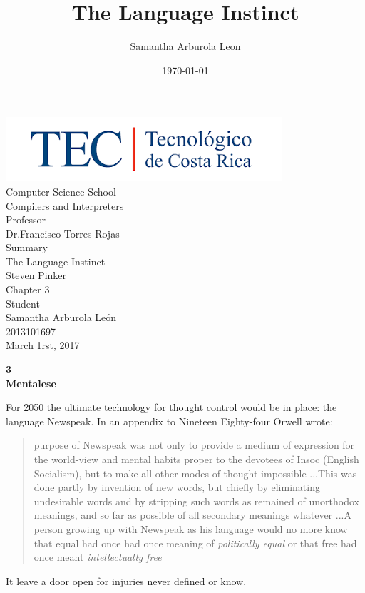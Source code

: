 \documentclass[13pt,letterpaper,onecolumn]{report}
\author{Samantha Arburola Leon}
\title{The Language Instinct}
\date{\today}
\begin{document}
\vspace{10em}
\begin{center}
\includegraphics{tec} \\
\vspace{2em}
Computer Science School\\Compilers and Interpreters\\
\vspace{1em}
Professor\\Dr.Francisco Torres Rojas \\
\vspace{7em}
Summary \\ The Language Instinct\\Steven Pinker\\Chapter 3\\
\vspace{5em}
Student\\ Samantha Arburola Le\'on \\ 2013101697\\
\vspace{10em}
March 1rst, 2017
\end{center}
\pagebreak[4]

\begin{center}
{\huge\bfseries 3\\Mentalese\par} \vspace{2em}
\end{center}
\hspace{1em}For 2050 the ultimate technology for thought control would be in place: the language Newspeak. In an appendix to Nineteen Eighty-four Orwell wrote:\\
\begin{quote}
purpose of Newspeak was not only to provide a medium of expression for the world-view and mental habits proper to the devotees of Insoc (English Socialism), but to make all other modes of thought impossible ...This was done partly by invention of new words, but chiefly by eliminating undesirable words and by stripping such words as remained of unorthodox meanings, and so far as possible of all secondary meanings whatever ...A person growing up with Newspeak as his language would no more know that equal had once had once meaning of \textit{politically equal} or that free had once meant \textit{intellectually free}
\end{quote} 
It leave a door open for injuries never defined or know.\\
\end{document}
